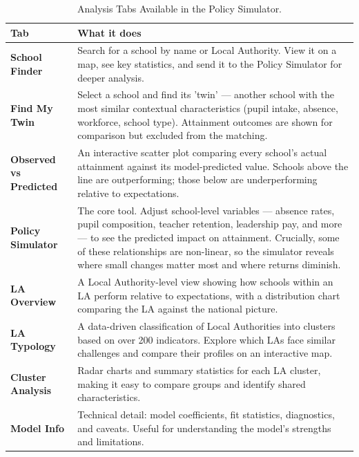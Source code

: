 \documentclass[
  11pt,
]{article}
\begin{document}
\begingroup\fontsize{11}{13}\selectfont

\begin{longtable}[t]{>{\raggedright\arraybackslash}p{10em}>{\raggedright\arraybackslash}p{40em}}

\caption{\label{tbl-simulator-tabs}Analysis Tabs Available in the Policy
Simulator.}

\tabularnewline

\toprule
Tab & What it does\\
\midrule
\textbf{School Finder} & Search for a school by name or Local Authority. View it on a map, see key statistics, and send it to the Policy Simulator for deeper analysis.\\
\textbf{Find My Twin} & Select a school and find its 'twin' — another school with the most similar contextual characteristics (pupil intake, absence, workforce, school type). Attainment outcomes are shown for comparison but excluded from the matching.\\
\textbf{Observed vs Predicted} & An interactive scatter plot comparing every school's actual attainment against its model-predicted value. Schools above the line are outperforming; those below are underperforming relative to expectations.\\
\textbf{Policy Simulator} & The core tool. Adjust school-level variables — absence rates, pupil composition, teacher retention, leadership pay, and more — to see the predicted impact on attainment. Crucially, some of these relationships are non-linear, so the simulator reveals where small changes matter most and where returns diminish.\\
\textbf{LA Overview} & A Local Authority-level view showing how schools within an LA perform relative to expectations, with a distribution chart comparing the LA against the national picture.\\
\addlinespace
\textbf{LA Typology} & A data-driven classification of Local Authorities into clusters based on over 200 indicators. Explore which LAs face similar challenges and compare their profiles on an interactive map.\\
\textbf{Cluster Analysis} & Radar charts and summary statistics for each LA cluster, making it easy to compare groups and identify shared characteristics.\\
\textbf{Model Info} & Technical detail: model coefficients, fit statistics, diagnostics, and caveats. Useful for understanding the model's strengths and limitations.\\
\bottomrule

\end{longtable}
\end{document}
